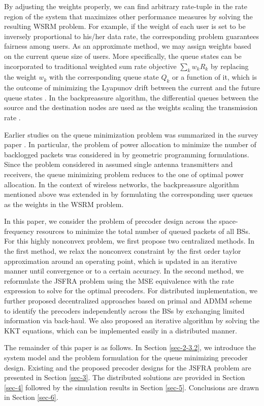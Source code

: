 By adjusting the weights properly, we can find arbitrary rate-tuple in the rate region of the system that maximizes other performance measures by solving the resulting WSRM problem. For example, if the weight of each user is set to be inversely proportional to his/her data rate, the corresponding problem guarantees fairness among users. As an approximate method, we may assign weights based on the current queue size of users. More specifically, the queue states can be incorporated to traditional weighted sum rate objective $\sum_k w_k R_k$ by replacing the weight $w_k$ with the corresponding queue state $Q_k$ or a function of it,  which is the outcome of minimizing the Lyapunov drift between the current and the future queue states \cite{tassiulas,neely2010stochastic}. In the backpreassure algorithm, the differential queues between the source and the destination nodes are used as the weights scaling the transmission rate \cite{georgiadis2006resource}.

Earlier studies on the queue minimization problem was summarized in the survey paper \cite{berry2004cross}. In particular, the problem of power allocation to minimize the number of backlogged packets was considered in \cite{qps_cioffi} by geometric programming formulations. Since the problem considered in \cite{qps_cioffi} assumed single antenna transmitters and receivers, the queue minimizing problem reduces to the one of optimal power allocation. In the context of wireless networks, the backpreassure algorithm mentioned above was extended in \cite{weeraddana2011resource} by formulating the corresponding user queues as the weights in the \ac{WSRM} problem.

In this paper, we consider the problem of precoder design across the space-frequency resources to minimize the total number of queued packets of all \acp{BS}. For this highly nonconvex problem, we first propose two centralized methods. In the first method, we relax the nonconvex constraint by the first order taylor approximation around an operating point, which is updated in an iterative manner until convergence or to a certain accuracy. In the second method, we reformulate the \ac{JSFRA} problem using the \ac{MSE} equivalence with the rate expression to solve for the optimal precoders. For distributed implementation, we further proposed decentralized approaches based on primal and \ac{ADMM} scheme to identify the precoders independently across the \acp{BS} by exchanging limited information via back-haul. We also proposed an iterative algorithm by solving the \ac{KKT} equations, which can be implemented easily in a distributed manner.

The remainder of this paper is as follows. In Section \ref{sec-2-3.2}, we introduce the system model and the problem formulation for the queue minimizing precoder design. Existing and the proposed precoder designs for the \ac{JSFRA} problem are presented in Section \ref{sec-3}. The distributed solutions are provided in Section \ref{sec-4} followed by the simulation results in Section \ref{sec-5}. Conclusions are drawn in Section \ref{sec-6}.
